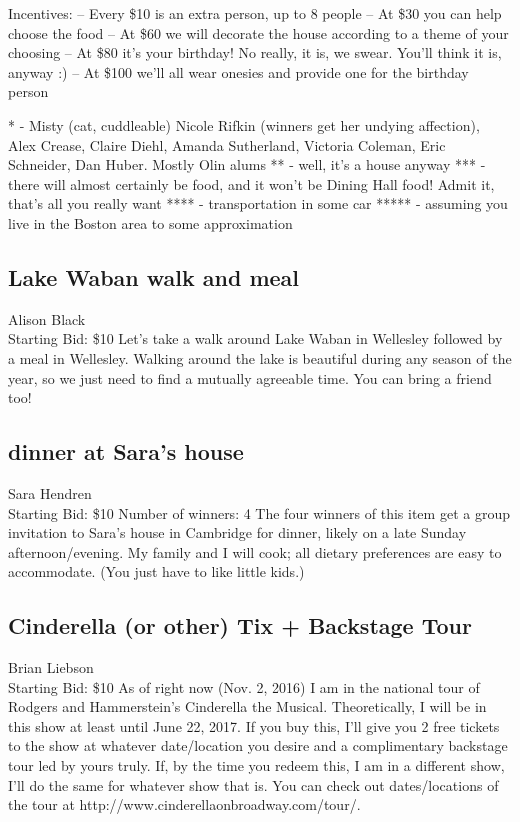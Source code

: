 \documentclass[11pt]{article}
\begin{document}
Incentives:
-- Every \$10 is an extra person, up to 8 people
-- At \$30 you can help choose the food
-- At \$60 we will decorate the house according to a theme of your choosing
-- At \$80 it's your birthday! No really, it is, we swear. You'll think it is, anyway :)
-- At \$100 we'll all wear onesies and provide one for the birthday person

* - Misty (cat, cuddleable) Nicole Rifkin (winners get her undying affection), Alex Crease, Claire Diehl, Amanda Sutherland, Victoria Coleman, Eric Schneider, Dan Huber. Mostly Olin alums
** - well, it's a house anyway
*** - there will almost certainly be food, and it won't be Dining Hall food! Admit it, that's all you really want
**** - transportation in some car
***** - assuming you live in the Boston area to some approximation
\subsection{Lake Waban walk and meal}
Alison Black
\\
Starting Bid: \$10
\newline
Let's take a walk around Lake Waban in Wellesley followed by a meal in Wellesley.  Walking around the lake is beautiful during any season of the year, so we just need to find a mutually agreeable time.  You can bring a friend too!
\subsection{dinner at Sara's house}
Sara Hendren
\\
Starting Bid: \$10
\newline
Number of winners: 4
\newline
The four winners of this item get a group invitation to Sara's house in Cambridge for dinner, likely on a late Sunday afternoon/evening. My family and I will cook; all dietary preferences are easy to accommodate. (You just have to like little kids.)
\subsection{Cinderella (or other) Tix + Backstage Tour}
Brian Liebson
\\
Starting Bid: \$10
\newline
As of right now (Nov. 2, 2016) I am in the national tour of Rodgers and Hammerstein's Cinderella the Musical. Theoretically, I will be in this show at least until June 22, 2017. If you buy this, I'll give you 2 free tickets to the show at whatever date/location you desire and a complimentary backstage tour led by yours truly. If, by the time you redeem this, I am in a different show, I'll do the same for whatever show that is. You can check out dates/locations of the tour at http://www.cinderellaonbroadway.com/tour/.
\end{document}
